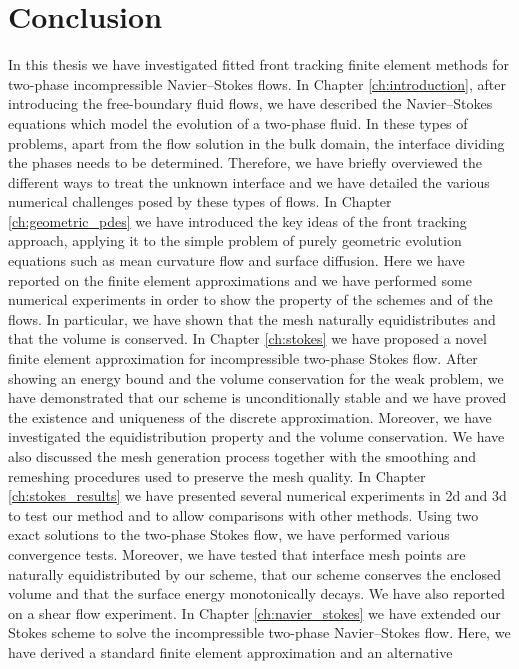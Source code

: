\chapter{\sc Conclusion}\label{ch:conclusion}

In this thesis we have investigated fitted front tracking finite element
methods for two-phase incompressible Navier--Stokes flows. In Chapter
\ref{ch:introduction}, after introducing the free-boundary fluid flows, we have
described the Navier--Stokes equations which model the evolution of a two-phase
fluid. In these types of problems, apart from the flow solution in the bulk
domain, the interface dividing the phases needs to be determined. Therefore, we
have briefly overviewed the different ways to treat the unknown interface and we
have detailed the various numerical challenges posed by these types of flows.
In Chapter \ref{ch:geometric_pdes} we have introduced the key ideas of the
front tracking approach, applying it to the simple problem of purely geometric
evolution equations such as mean curvature flow and surface diffusion. Here we
have reported on the finite element approximations and we have performed some
numerical experiments in order to show the property of the schemes and of the
flows. In particular, we have shown that the mesh naturally equidistributes and
that the volume is conserved. In Chapter \ref{ch:stokes} we have proposed a
novel finite element approximation for incompressible two-phase Stokes flow.
After showing an energy bound and the volume conservation for the weak problem,
we have demonstrated that our scheme is unconditionally stable and we have
proved the existence and uniqueness of the discrete approximation. Moreover, we
have investigated the equidistribution property and the volume conservation. We
have also discussed the mesh generation process together with the smoothing and
remeshing procedures used to preserve the mesh quality. In Chapter
\ref{ch:stokes_results} we have presented several numerical experiments in 2d
and 3d to test our method and to allow comparisons with other methods. Using
two exact solutions to the two-phase Stokes flow, we have performed various
convergence tests. Moreover, we have tested that interface mesh points are
naturally equidistributed by our scheme, that our scheme conserves the enclosed
volume and that the surface energy monotonically decays. We have also reported
on a shear flow experiment. In Chapter \ref{ch:navier_stokes} we have extended
our Stokes scheme to solve the incompressible two-phase Navier--Stokes flow.
Here, we have derived a standard finite element approximation and an alternative
